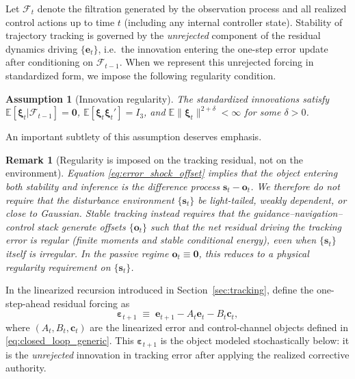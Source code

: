 \documentclass{article}
\newtheorem{remark}{Remark}
\newtheorem{assumption}{Assumption}
\begin{document}
Let $\mathcal{F}_t$ denote the filtration generated by the observation process and all realized control actions
up to time $t$ (including any internal controller state). Stability of trajectory tracking is governed by the
\emph{unrejected} component of the residual dynamics driving $\{\mathbf{e}_t\}$, i.e.\ the innovation entering the
one-step error update after conditioning on $\mathcal{F}_{t-1}$.
When we represent this unrejected forcing in standardized form, we impose the following regularity condition.

\begin{assumption}[Innovation regularity]
\label{ass:innov_reg}
The standardized innovations satisfy $\mathbb{E}[\boldsymbol{\xi}_t|\mathcal{F}_{t-1}]=\mathbf{0}$,
$\mathbb{E}[\boldsymbol{\xi}_t\boldsymbol{\xi}_t']=I_3$, and $\mathbb{E}\|\boldsymbol{\xi}_t\|^{2+\delta}<\infty$ for some $\delta>0$.
\end{assumption}

An important subtlety of this assumption deserves emphasis.

\begin{remark}[Regularity is imposed on the tracking residual, not on the environment]
\label{rem:regularity_on_e}
Equation \eqref{eq:error_shock_offset} implies that the object entering both stability and inference is the
\emph{difference process} $\mathbf{s}_t-\mathbf{o}_t$. We therefore do \emph{not} require that the disturbance
environment $\{\mathbf{s}_t\}$ be light-tailed, weakly dependent, or close to Gaussian.
Stable tracking instead requires that the guidance--navigation--control stack generate offsets $\{\mathbf{o}_t\}$
such that the \emph{net residual} driving the tracking error is regular (finite moments and stable conditional
energy), even when $\{\mathbf{s}_t\}$ itself is irregular. In the passive regime $\mathbf{o}_t\equiv \mathbf{0}$,
this reduces to a physical regularity requirement on $\{\mathbf{s}_t\}$.
\end{remark}

In the linearized recursion introduced in Section~\ref{sec:tracking}, define the one-step-ahead residual forcing as
\begin{equation}
\boldsymbol{\varepsilon}_{t+1}
\;\equiv\;
\mathbf{e}_{t+1}-A_t\mathbf{e}_t-B_t\mathbf{c}_t,
\label{eq:eps_def_from_e}
\end{equation}
where $(A_t,B_t,\mathbf{c}_t)$ are the linearized error and control-channel objects defined in
\eqref{eq:closed_loop_generic}. This $\boldsymbol{\varepsilon}_{t+1}$ is the object modeled stochastically below:
it is the \emph{unrejected} innovation in tracking error after applying the realized corrective authority.
\end{document}

